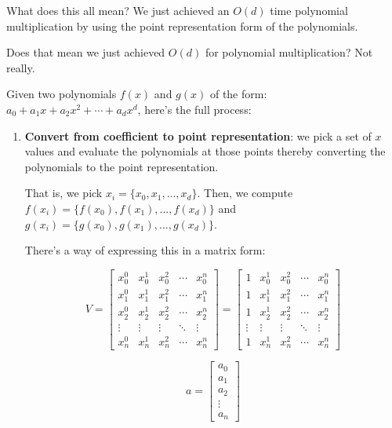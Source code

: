 \documentclass[11pt]{article}
\begin{document}
What does this all mean? We just achieved an \(O(d)\) time polynomial
multiplication by using the point representation form of the
polynomials.

Does that mean we just achieved \(O(d)\) for polynomial multiplication?
Not really.

Given two polynomials \(f(x)\) and \(g(x)\) of the form:
\(a_0 + a_1x + a_2x^2 + \cdots + a_{d}x^{d}\), here's the full process:

\begin{enumerate}
\def\labelenumi{\arabic{enumi}.}
\item
  \textbf{Convert from coefficient to point representation}: we pick a
  set of \(x\) values and evaluate the polynomials at those points
  thereby converting the polynomials to the point representation.

  That is, we pick \(x_i = \{x_0, x_1, ... ,x_d \}\). Then, we compute
  \(f(x_i) = \{f(x_0), f(x_1),...,f(x_d)\}\) and
  \(g(x_i) = \{g(x_0), g(x_1),...,g(x_d)\}\).

  There's a way of expressing this in a matrix form:

  \[ V = \begin{bmatrix}x_0^0 & x_0^1 & x_0^2 & \cdots & x_0^{n} \\ x_1^0 & x_1^1 & x_1^2 & \cdots & x_1^{n} \\ x_2^0 & x_2^1 & x_2^2 & \cdots & x_2^{n} \\[0.3em]\vdots & \vdots & \vdots & \ddots & \vdots \\[0.3em]x_n^0 & x^1_{n} & x_{n}^2 & \cdots & x_{n}^{n}\end{bmatrix} = \begin{bmatrix}1 & x_0^1 & x_0^2 & \cdots & x_0^{n} \\ 1 & x_1^1 & x_1^2 & \cdots & x_1^{n} \\ 1 & x_2^1 & x_2^2 & \cdots & x_2^{n} \\[0.3em]\vdots & \vdots & \vdots & \ddots & \vdots \\[0.3em]1 & x^1_{n} & x_{n}^2 & \cdots & x_{n}^{n}\end{bmatrix}\]

  \[a = \begin{bmatrix}a_0 \\ a_1 \\ a_2 \\ \vdots \\ a_n\end{bmatrix}\]


\end{enumerate}
\end{document}
